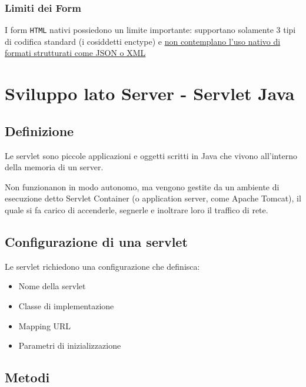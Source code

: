 \subsection{Limiti dei Form}
I form \texttt{HTML} nativi possiedono un limite importante: supportano solamente 3 tipi di codifica standard (i cosiddetti enctype) e \uline{non contemplano l'uso nativo di formati strutturati come JSON o XML}

\chapter{Sviluppo lato Server - Servlet Java}
\section{Definizione}
Le servlet sono piccole applicazioni e oggetti scritti in Java che vivono all'interno della memoria di un server.

Non funzionanon in modo autonomo, ma vengono gestite da un ambiente di esecuzione detto Servlet Container (o application server, come Apache Tomcat), il quale si fa carico di accenderle, segnerle e inoltrare loro il traffico di rete.

\section{Configurazione di una servlet}
Le servlet richiedono una configurazione che definisca:
\begin{itemize}
    \item Nome della servlet
    \item Classe di implementazione
    \item Mapping URL
    \item Parametri di inizializzazione
\end{itemize}

\section{Metodi}
